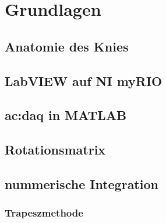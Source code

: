 %
%
\chapter{Grundlagen}\label{ch:grundlagen}
\section{Anatomie des Knies}
\section{LabVIEW auf NI myRIO}
\section{\acrshort{ac:daq} in MATLAB}
\section{Rotationsmatrix}
\section{nummerische Integration}
\subsection{Trapeszmethode}